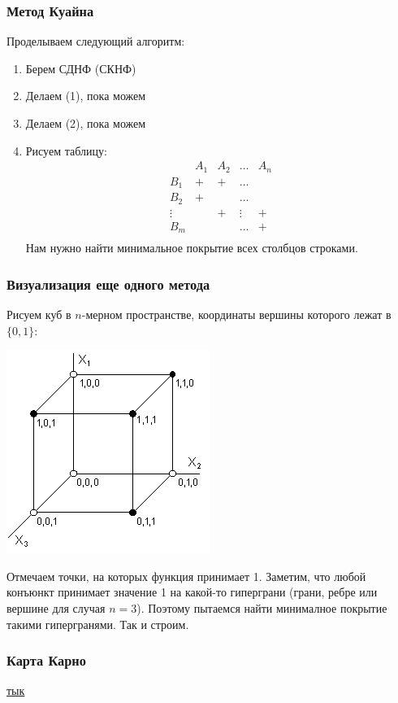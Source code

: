 \subsubsection{Метод Куайна}
Проделываем следующий алгоритм:
\begin{enumerate}
    \item Берем СДНФ (СКНФ)
    \item Делаем (1), пока можем
    \item Делаем (2), пока можем
    \item Рисуем таблицу:
    $$\begin{array}{c|c|c|c|c}
        & A_1 & A_2 & \dots & A_n \\
        \hline
        B_1 & + & + &\dots & \\
        \hline
        B_2 & + & & \dots & \\
        \hline
        \vdots & & + & \vdots & + \\ 
        \hline
        B_m & &  & \dots & +\\
    \end{array}$$
    Нам нужно найти минимальное покрытие всех столбцов строками.
\end{enumerate}

\subsubsection{Визуализация еще одного метода}

Рисуем куб в $n$-мерном пространстве, координаты вершины которого лежат в $\{0, 1\}$:\\

\begin{center}
    \includegraphics[scale=0.6]{images/Pic_2_1d.png}
\end{center}

Отмечаем точки, на которых функция принимает 1. Заметим, что любой конъюнкт принимает значение 1 на какой-то гиперграни (грани, ребре или вершине для случая $n = 3$). Поэтому пытаемся найти минималное покрытие такими гипергранями. Так и строим.

\subsubsection{Карта Карно}
\href{https://ru.wikipedia.org/wiki/Карта_Карно}{тык}